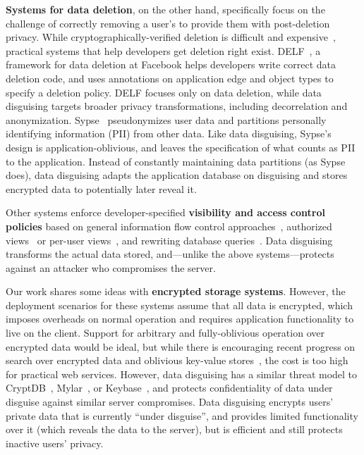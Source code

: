 %
\textbf{Systems for data deletion}, on the other hand, specifically focus on the
challenge of correctly removing a user's to provide them with post-deletion
privacy.
%
While cryptographically-verified deletion is difficult and expensive~\cite{vanish},
practical systems that help developers get deletion right exist.
%
DELF~\cite{delf}, a framework for data deletion at Facebook helps developers write
correct data deletion code, and uses annotations on application edge and object types
to specify a deletion policy.
%
DELF focuses only on data deletion, while data disguising targets broader privacy
transformations, including decorrelation and anonymization.
%
Sypse~\cite{sypse} pseudonymizes user data and partitions personally identifying
information (PII) from other data.
%
Like data disguising, Sypse's design is application-oblivious, and leaves
the specification of what counts as PII to the application.
%
Instead of constantly maintaining data partitions (as Sypse does), data disguising
adapts the application database on disguising and stores encrypted data to
potentially later reveal it.
%

%
Other systems enforce developer-specified \textbf{visibility and access control policies}
based on general information flow control approaches~\cite{static, jeeves, jif, hails, ifdb},
authorized views~\cite{oracle} or per-user views~\cite{multiverse}, and rewriting database
queries~\cite{qapla, sieve}.
%
Data disguising transforms the actual data stored, and---unlike the above systems---protects
against an attacker who compromises the server.
%

%
Our work shares some ideas with \textbf{encrypted storage systems}.
%
However, the deployment scenarios for these systems assume that all data is
encrypted, which imposes overheads on normal operation and requires application
functionality to live on the client.
%
Support for arbitrary and fully-oblivious operation over encrypted data would
be ideal, but while there is encouraging recent progress on search over encrypted
data and oblivious key-value stores~\cite{dory, snoopy}, the cost is too high for
practical web services.
%
However, data disguising has a similar threat model to CryptDB~\cite{cryptdb},
Mylar~\cite{mylar}, or Keybase~\cite{keybase}, and protects confidentiality of
data under disguise against similar server compromises.
%
Data disguising encrypts users' private data that is currently ``under disguise'',
and provides limited functionality over it (which reveals the data to
the server), but is efficient and still protects inactive users' privacy.
%

